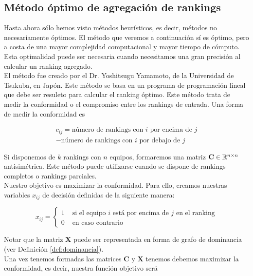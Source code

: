 \subsection{Método óptimo de agregación de rankings}

Hasta ahora sólo hemos visto métodos heurísticos, es decir, métodos no necesariamente óptimos. El método que veremos a continuación sí es óptimo, pero a costa de una mayor complejidad computacional y mayor tiempo de cómputo. Esta optimalidad puede ser necesaria cuando necesitamos una gran precisión al calcular un ranking agregado.\\

El método fue creado por el Dr. Yoshitsugu Yamamoto, de la Universidad de Tsukuba, en Japón. Este método se basa en un programa de programación lineal que debe ser resuleto para calcular el ranking óptimo. Este método trata de medir la conformidad o el compromiso entre los rankings de entrada. Una forma de medir la conformidad es

\begin{multline} \label{eq:conformidad}
c_{ij} = \text{número de rankings con $i$ por encima de $j$} \\ - \text{número de rankings con $i$ por debajo de $j$}
\end{multline}

Si disponemos de $k$ rankings con $n$ equipos, formaremos una matriz $\mathbf{C} \in \mathbb{R}^{n\times n}$ antisimétrica. Este método puede utilizarse cuando se dispone de rankings completos o rankings parciales.\\

Nuestro objetivo es maximizar la conformidad. Para ello, creamos nuestras variables $x_{ij}$ de decisión definidas de la siguiente manera:

\begin{equation}
x_{ij} = \begin{cases}
1 & \text{ si el equipo $i$ está por encima de $j$ en el ranking}\\
0 & \text{ en caso contrario}
\end{cases}
\end{equation}

Notar que la matriz $\mathbf{X}$ puede ser representada en forma de grafo de dominancia (ver Definición \ref{def:dominancia}).\\

Una vez tenemos formadas las matrices $\mathbf{C}$ y $\mathbf{X}$ tenemos debemos maximizar la conformidad, es decir, nuestra función objetivo será

